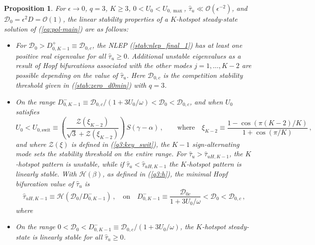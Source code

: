 \documentclass{article}%
\newtheorem{prop}[theorem]{Proposition}
\begin{document}
\begin{prop}\label{q3:main_Kspots} For $\epsilon\to 0$, 
$q=3$, $K\geq 3$, $0<U_0<U_{0,\max}$, $\hat{\tau}_u\ll
  {\mathcal O}(\epsilon^{-2})$, and ${\mathcal D}_0=\epsilon^2 D =
  {\mathcal O}(1)$, the linear stability properties of a $K$-hotspot
  steady-state solution of (\ref{eq:pol-main}) are as follows:
\begin{itemize}
  \item For ${\mathcal D}_0>D^{+}_{0,K-1} \equiv {\mathcal D}_{0,c}$, the
    NLEP (\ref{stab:nlep_final_1}) has at least one positive real eigenvalue for
    all $\hat{\tau}_u\geq 0$. Additional unstable eigenvalues as a result
    of Hopf bifurcations associated with the other modes $j=1,\ldots,K-2$ 
    are possible  depending on the value of $\hat{\tau}_u$. Here 
    ${\mathcal D}_{0,c}$ is the competition stability threshold given in
    (\ref{stab:zero_d0min}) with $q=3$.
 \item On the range $D^{-}_{0,K-1} \equiv 
  {{\mathcal D}_{0,c}/\left(1+{3U_0/\omega}\right)} < {\mathcal D}_0
    <{\mathcal D}_{0,c}$, and when $U_0$ satisfies
\begin{equation}\label{q3:u0mon}
     U_0 < U_{0,\textrm{swit}} \equiv \left( \frac{ {\mathcal Z}(\xi_{K-2})}
  { \sqrt{3} + {\mathcal Z}(\xi_{K-2})} \right) \, S(\gamma-\alpha)
  \,, \qquad \mbox{where} \quad \xi_{K-2} \equiv 
  \frac{1- \cos\left({\pi (K-2)/K}\right)}{1 + \cos\left({\pi /K}\right)} \,, 
\end{equation}
and where ${\mathcal Z}(\xi)$ is defined in (\ref{q3:key_swit}), the
$K-1$ sign-alternating mode sets the stability threshold on the entire
range.  For $\hat{\tau}_u>\hat{\tau}_{uH,K-1}$, the $K$-hotspot
pattern is unstable, while if $\hat{\tau}_u<\hat{\tau}_{uH,K-1}$ the
$K$-hotspot pattern is linearly stable. With ${\mathcal H}(\beta)$, as
defined in (\ref{q3:h}), the minimal Hopf bifurcation value of
$\hat{\tau}_u$ is 
\begin{equation}\label{q3:Kosc}
 \hat{\tau}_{uH,K-1}\equiv {\mathcal H}\left({{\mathcal
     D}_0/D^{-}_{0,K-1}}\right) \,, \quad \mbox{on} \quad
 D^{-}_{0,K-1}\equiv \frac{{\mathcal D}_{0c}}{1+{3U_0/\omega}}<{\mathcal
   D}_0 <{\mathcal D}_{0,c} \,,
\end{equation}
where 
\item On the range $0<{\mathcal D}_0 < D^{-}_{0,K-1} \equiv {{\mathcal
    D}_{0,c}/\left(1+{3U_0/\omega}\right)}$, the $K$-hotspot
  steady-state is linearly stable for all $\hat{\tau}_u\geq 0$.
\end{itemize}
\end{prop}
\end{document}
